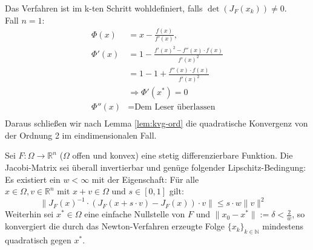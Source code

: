 \begin{bemerkung}
Das Verfahren ist im k-ten Schritt wohldefiniert,
falls $\det(J_F(x_k))\neq 0$.\\ %
Fall $n=1:$
\begin{align*}
\Phi(x)     &=x-\frac{f(x)}{f'(x)},\\
\Phi'(x)    &=1-\frac{{f'(x)}^2-f''(x)\cdot f(x)}{{f'(x)}^2}\\
            &=1-1+\frac{f''(x)\cdot f(x)}{{f'(x)}^2}\\
            &\Rightarrow \Phi'(x^*)=0\\
\Phi''(x)   &=\text{Dem Leser überlassen} \\
\end{align*}
Daraus schließen wir nach Lemma \ref{lem:kvg-ord} die quadratische Konvergenz von der Ordnung 2 im eindimensionalen
Fall.
\end{bemerkung}

\begin{lemma}
Sei $F:\Omega \longrightarrow \mathbb{R}^n$ ($\Omega$ offen und konvex)
eine stetig differenzierbare Funktion. Die Jacobi-Matrix sei überall invertierbar
und genüge folgender Lipschitz-Bedingung: Es existiert ein $w<\infty$ mit der Eigenschaft:
Für alle $x\in \Omega, v\in \mathbb{R}^n \text{ mit } x+v\in \Omega \text{ und }
s\in [0,1]$ gilt:
\[
\|{J_F(x)}^{-1}\cdot (J_F(x+s\cdot v)-J_F(x))\cdot v\|\leq s\cdot  w \|v\|^2 \quad
\]
Weiterhin sei $x^*\in \Omega$ eine einfache Nullstelle von $F$ und $\|x_0-x^*\|:=\delta<\frac{2}{ w}$, so konvergiert die durch das Newton-Verfahren erzeugte Folge $\{x_k\}_{k\in \mathbb{N}}$ mindestens quadratisch gegen $x^*$. 
\end{lemma}

